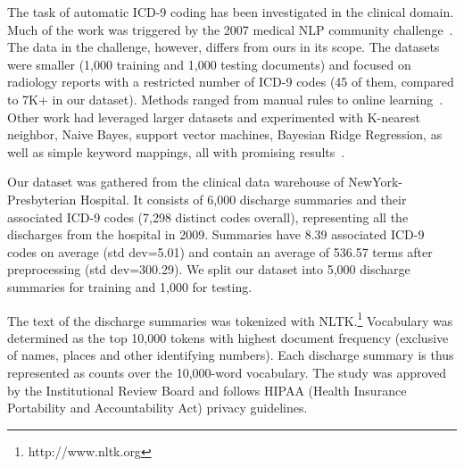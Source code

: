 The task of automatic ICD-9 coding has been investigated in the clinical
domain. Much of the work was triggered by the 2007 medical NLP community
challenge~\cite{Challenge07}. The data in the challenge, however, differs from 
ours in its scope. The datasets were smaller (1,000 training and 1,000 testing
documents) and focused on radiology reports with a restricted number of ICD-9
codes (45 of them, compared to 7K+ in our dataset). Methods ranged from manual
rules to online learning~\cite{Crammer2007,Goldstein2007,Farkas2008}.
Other work had leveraged larger datasets and experimented with K-nearest
neighbor, Naive Bayes, support vector machines, Bayesian Ridge Regression, as
well as simple keyword mappings, all with promising
results~\cite{LarkeyCroft95,RibeiroNeto2001,PakhomovEtAl06,Ruch2008,Lita2008}.

Our dataset was gathered from the clinical data warehouse of
NewYork-Presbyterian Hospital. It consists of 6,000 discharge summaries and
their associated ICD-9 codes (7,298 distinct codes overall), representing all
the discharges from the hospital in 2009. Summaries have 8.39 associated ICD-9
codes on average (std dev=5.01) and contain an average of 536.57 terms after
preprocessing (std dev=300.29). We split our dataset into 5,000 discharge
summaries for training and 1,000 for testing.

The text of the discharge summaries was tokenized with
NLTK.\footnote{http://www.nltk.org} Vocabulary was determined as the top 10,000
tokens with highest document frequency (exclusive of names,
places and other identifying numbers). Each discharge summary is thus
represented as counts over the 10,000-word vocabulary. The study was approved
by the Institutional Review Board and follows HIPAA (Health
Insurance Portability and Accountability Act) privacy guidelines.


